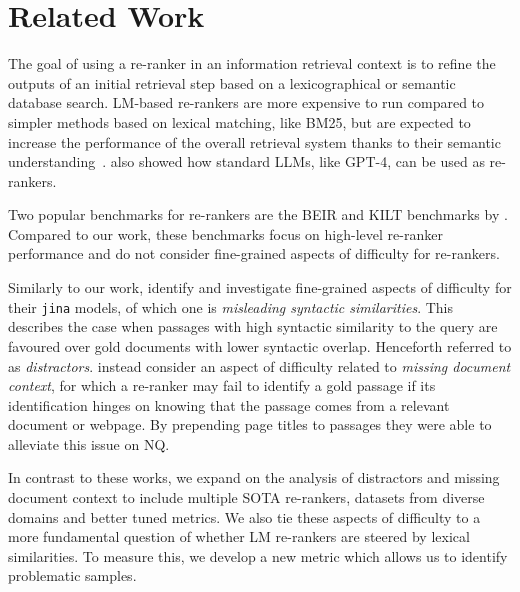 \section{Related Work}
The goal of using a re-ranker in an information retrieval context is to refine the outputs of an initial retrieval step based on a lexicographical or semantic database search. LM-based re-rankers are more expensive to run compared to simpler methods based on lexical matching, like BM25, but are expected to increase the performance of the overall retrieval system thanks to their semantic understanding~\citep{glass-etal-2022-re2g,li2023making}. 
\citet{sun-etal-2023-chatgpt} also showed how standard LLMs, like GPT-4, can be used as re-rankers.

Two popular benchmarks for re-rankers are the BEIR and KILT benchmarks by \citet{thakur2021beir,petroni-etal-2021-kilt}. 
Compared to our work, these benchmarks focus on high-level re-ranker performance and do not consider fine-grained aspects of difficulty for re-rankers. 

Similarly to our work, \citet{sturua2024jina} identify and investigate fine-grained aspects of difficulty for their \texttt{jina} models, of which one is \emph{misleading syntactic similarities}. This describes the case when passages with high syntactic similarity to the query are favoured over gold documents with lower syntactic overlap. Henceforth referred to as \emph{distractors}. 
\citet{wang-etal-2024-dapr} instead consider an aspect of difficulty related to \emph{missing document context}, for which a re-ranker may fail to identify a gold passage if its identification hinges on knowing that the passage comes from a relevant document or webpage. By prepending page titles to passages they were able to alleviate this issue on NQ. 

In contrast to these works, we expand on the analysis of distractors and missing document context to include multiple SOTA re-rankers, datasets from diverse domains and better tuned metrics. We also tie these aspects of difficulty to a more fundamental question of whether LM re-rankers are steered by lexical similarities. To measure this, we develop a new metric which allows us to identify problematic samples.